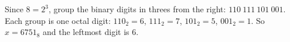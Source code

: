 Since $8=2^3$, group the binary digits in threes from the right: $110\ 111\ 101\ 001$. Each group is one octal digit: $110_2=6$, $111_2=7$, $101_2=5$, $001_2=1$. So $x=6751_8$ and the leftmost digit is $\boxed{6}$.
